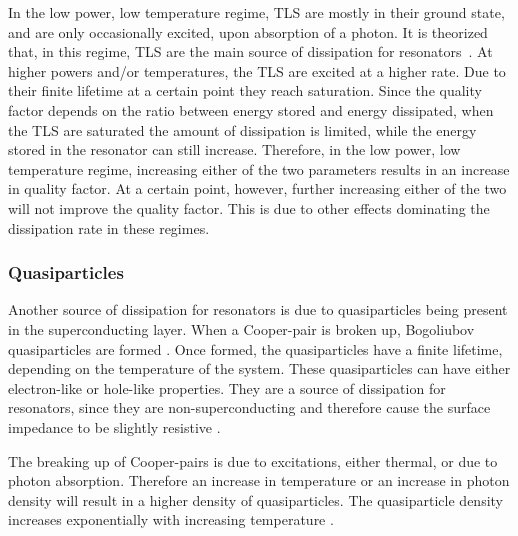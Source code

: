       In the low power, low temperature regime, TLS are mostly in their ground state, and are only occasionally excited, upon absorption of a photon. It is theorized that, in this regime, TLS are the main source of dissipation for resonators~\cite{gao2008experimental}. At higher powers and/or temperatures, the TLS are excited at a higher rate. Due to their finite lifetime at a certain point they reach saturation. Since the quality factor depends on the ratio between energy stored and energy dissipated, when the TLS are saturated the amount of dissipation is limited, while the energy stored in the resonator can still increase. Therefore, in the low power, low temperature regime, increasing either of the two parameters results in an increase in quality factor. At a certain point, however, further increasing either of the two will not improve the quality factor. This is due to other effects dominating the dissipation rate in these regimes.




    \subsubsection{Quasiparticles}

      Another source of dissipation for resonators is due to quasiparticles being present in the superconducting layer. When a Cooper-pair is broken up, Bogoliubov quasiparticles are formed \cite[p16]{Barends}. Once formed, the quasiparticles have a finite lifetime, depending on the temperature of the system. These quasiparticles can have either electron-like or hole-like properties. They are a source of dissipation for resonators, since they are non-superconducting and therefore cause the surface impedance to be slightly resistive \cite[p18]{Mazin}.

      The breaking up of Cooper-pairs is due to excitations, either thermal, or due to photon absorption. Therefore an increase in temperature or an increase in photon density will result in a higher density of quasiparticles. The quasiparticle density increases exponentially with increasing temperature \cite[p44]{Mazin}.


